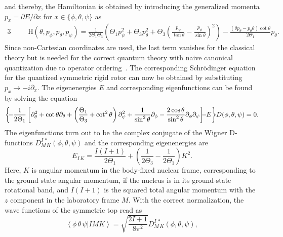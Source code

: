 and thereby, the Hamiltonian is obtained by introducing the generalized momenta $p_x=\partial E / \partial x$ for $x\in \{ \phi,\theta,\psi\}$ as
\begin{alignat}{3}
&&&\mathrm{H}(\theta,p_\phi,p_\theta,p_\psi)=\frac{1}{2\Theta_1 \Theta_3}\left( \Theta_1 p^2_\psi + \Theta_3 p^2_\theta + \Theta_3 \left( \frac{p_\psi}{\tan\theta} - \frac{p_\phi}{\sin\theta} \right)^2 \right)
-\frac{(\theta p_\theta - p_\theta \theta)\cot\theta }{2\Theta_1}p_\theta.
\end{alignat}
Since non-Cartesian coordinates are used, the last term vanishes for the classical theory but is needed for the correct quantum theory with naive canonical quantization due to operator ordering~\cite{podolsky1928}.
The corresponding Schrödinger equation for the quantized symmetric rigid rotor can now be obtained by substituting $p_x \rightarrow -i\partial_x$. The eigenenergies $E$ and corresponding eigenfunctions can be found by solving the equation~\cite{edmonds1960}
\begin{alignat}{2}
\left\{\hspace{-3pt}-\frac{1}{2\Theta_1}\left[ \partial^2_\theta + \cot\theta \partial_\theta+\left(\frac{\Theta_1}{\Theta_3}+\cot^2\theta\right)\partial_\psi^2+\frac{1}{\sin^2\theta}\partial_\phi-\frac{2\cos\theta}{\sin^2\theta}\partial_\phi\partial_\psi\right]\hspace{-5pt}-\hspace{-3pt}E\right\}\hspace{-2pt} D(\phi,\theta,\psi)=0.
\end{alignat}
The eigenfunctions turn out to be the complex conjugate of the Wigner D-functions $D^{I\,*}_{M\,K}(\phi,\theta,\psi)$ and the corresponding eigenenergies are~\cite{kronig1927}
\begin{equation}
E_{I\,K}=\frac{I(I+1)}{2\Theta_1}+ \left(\frac{1}{2\Theta_3}-\frac{1}{2\Theta_1}\right)K^2.
\label{eq:rig_rotorEn}
\end{equation}
Here, $K$ is angular momentum in the body-fixed nuclear frame, corresponding to the ground state angular momentum, if the nucleus is in its ground-state rotational band, and $I(I+1)$ is the squared total angular momentum with the $z$ component in the laboratory frame $M$. With the correct normalization, the wave functions of the symmetric top read as
\begin{equation}
\label{app:rigidRot_state}
\left<\phi\,\theta\,\psi|IMK\right> = \sqrt{\frac{2I+1}{8\pi^2}}D^{I\,*}_{M\,K}(\phi,\theta,\psi),
\end{equation}
